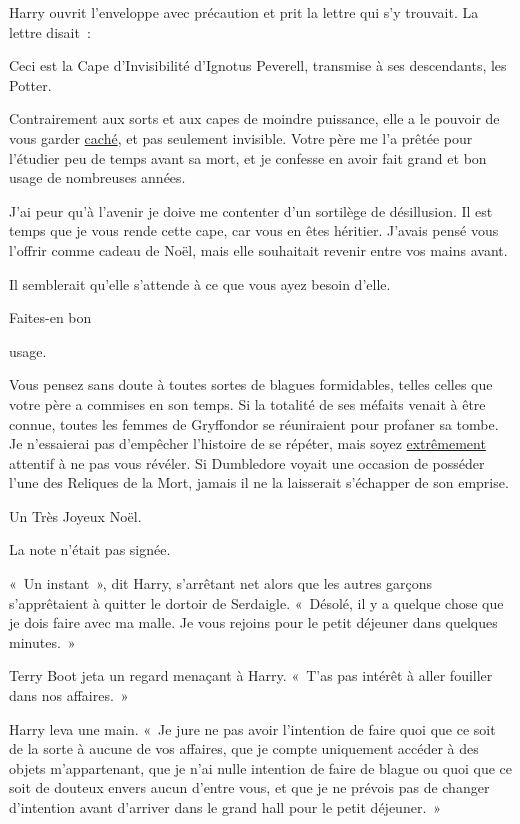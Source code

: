 Harry ouvrit l'enveloppe avec précaution et prit la lettre qui s'y trouvait.
La lettre disait~:
\begin{writtenNote}
Ceci est la Cape d'Invisibilité d'Ignotus Peverell, transmise à ses descendants, les Potter.
\strut Contrairement aux sorts et aux capes de moindre puissance, elle a le pouvoir de vous garder \underline{caché}, et pas seulement invisible.
Votre père me l'a prêtée pour l'étudier peu de temps avant sa mort, et je confesse en avoir fait grand et bon usage de nombreuses années.

J'ai peur qu'à l'avenir je doive me contenter d'un sortilège de désillusion.
Il est temps que je vous rende cette cape, car vous en êtes héritier.
J'avais pensé vous l'offrir comme cadeau de Noël, mais elle souhaitait revenir entre vos mains avant. \strut 
Il semblerait qu'elle s'attende à ce que vous ayez besoin d'elle. \strut
Faites-en bon \strut usage\vphantom{l}.

Vous pensez sans doute à toutes sortes de blagues formidables, telles celles que votre père a commises en son temps.
Si la totalité de ses méfaits venait à être connue, toutes les femmes de Gryffondor se réuniraient pour profaner sa tombe.
Je n'essaierai pas d'empêcher l'histoire de se répéter, mais soyez \underline{extrêmement} attentif à ne pas vous révéler.
Si Dumbledore voyait une occasion de posséder l'une des Reliques de la Mort, jamais il ne la laisserait s'échapper de son emprise.

Un Très Joyeux Noël.

\end{writtenNote}

La note n'était pas signée.

\later

«~Un instant~», dit Harry, s'arrêtant net alors que les autres garçons s'apprêtaient à quitter le dortoir de Serdaigle.
«~Désolé, il y a quelque chose que je dois faire avec ma malle.
Je vous rejoins pour le petit déjeuner dans quelques minutes.~»

Terry Boot jeta un regard menaçant à Harry.
«~T'as pas intérêt à aller fouiller dans nos affaires.~»

Harry leva une main.
«~Je jure ne pas avoir l'intention de faire quoi que ce soit de la sorte à aucune de vos affaires, que je compte uniquement accéder à des objets m'appartenant, que je n'ai nulle intention de faire de blague ou quoi que ce soit de douteux envers aucun d'entre vous, et que je ne prévois pas de changer d'intention avant d'arriver dans le grand hall pour le petit déjeuner.~»

